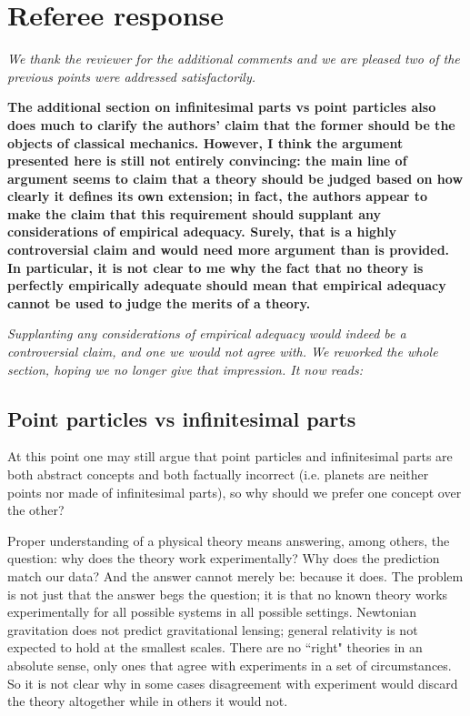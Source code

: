 \documentclass[11pt]{article}
\begin{document}
\section*{Referee response}

\emph{We thank the reviewer for the additional comments and we are pleased two of the previous points were addressed satisfactorily.}
\bigskip

\textbf{The additional section on infinitesimal parts vs point particles also does much to clarify the authors' claim that the former should be the objects of classical mechanics. However, I think the argument presented here is still not entirely convincing: the main line of argument seems to claim that a theory should be judged based on how clearly it defines its own extension; in fact, the authors appear to make the claim that this requirement should supplant any considerations of empirical adequacy. Surely, that is a highly controversial claim and would need more argument than is provided. In particular, it is not clear to me why the fact that no theory is perfectly empirically adequate should mean that empirical adequacy cannot be used to judge the merits of a theory. }

\emph{Supplanting any considerations of empirical adequacy would indeed be a controversial claim, and one we would not agree with. We reworked the whole section, hoping we no longer give that impression.  It now reads:}

\subsection*{Point particles vs infinitesimal parts}

At this point one may still argue that point particles and infinitesimal parts are both abstract concepts and both factually incorrect (i.e. planets are neither points nor made of infinitesimal parts), so why should we prefer one concept over the other?

Proper understanding of a physical theory means answering, among others, the question: why does the theory work experimentally? Why does the prediction match our data? And the answer cannot merely be: because it does. The problem is not just that the answer begs the question; it is that no known theory works experimentally for all possible systems in all possible settings. Newtonian gravitation does not predict gravitational lensing; general relativity is not expected to hold at the smallest scales. There are no ``right" theories in an absolute sense, only ones that agree with experiments in a set of circumstances. So it is not clear why in some cases disagreement with experiment would discard the theory altogether while in others it would not.
\end{document}
